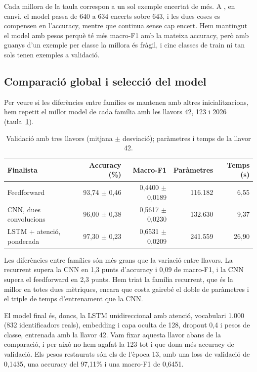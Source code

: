 \documentclass[11pt,a4paper]{article}
\newcommand{\intent}[1]{\texttt{\detokenize{#1}}}
\begin{document}
Cada millora de la taula correspon a un sol exemple encertat de més. A \intent{flight}, en canvi, el model passa de
640 a 634 encerts sobre 643, i les dues coses es compensen en l'accuracy, mentre que \intent{meal} continua sense
cap encert. Hem mantingut el model amb pesos perquè té més macro-F1 amb la mateixa accuracy, però amb guanys d'un
exemple per classe la millora és fràgil, i cinc classes de train ni tan sols tenen exemples a validació.

\subsection{Comparació global i selecció del model}
\label{sec:global}

Per veure si les diferències entre famílies es mantenen amb altres inicialitzacions, hem repetit el millor model
de cada família amb les llavors 42, 123 i 2026 (taula~\ref{tab:finalistes}).

\begin{table}[ht]
\centering\small
\caption{Validació amb tres llavors (mitjana $\pm$ desviació); paràmetres i temps de la llavor 42.}
\label{tab:finalistes}
\begin{tabular}{lrrrr}
\toprule
Finalista & Accuracy (\%) & Macro-F1 & Paràmetres & Temps (s)\\
\midrule
Feedforward & 93,74 $\pm$ 0,46 & 0,4400 $\pm$ 0,0189 & 116.182 & 6,55 \\
CNN, dues convolucions & 96,00 $\pm$ 0,38 & 0,5617 $\pm$ 0,0230 & 132.630 & 9,37 \\
LSTM + atenció, ponderada & 97,30 $\pm$ 0,23 & 0,6531 $\pm$ 0,0209 & 241.559 & 26,90 \\
\bottomrule
\end{tabular}
\end{table}

Les diferències entre famílies són més grans que la variació entre llavors. La recurrent supera la CNN en 1,3
punts d'accuracy i 0,09 de macro-F1, i la CNN supera el feedforward en 2,3 punts. Hem triat la família recurrent,
que és la millor en totes dues mètriques, encara que costa gairebé el doble de paràmetres i el triple de temps
d'entrenament que la CNN.

El model final és, doncs, la LSTM unidireccional amb atenció, vocabulari 1.000 (832 identificadors reals),
embedding i capa oculta de 128, dropout 0,4 i pesos de classe, entrenada amb la llavor 42. Vam fixar aquesta llavor
abans de la comparació, i per això no hem agafat la 123 tot i que dona més accuracy de validació. Els pesos
restaurats són els de l'època 13, amb una loss de validació de 0,1435, una accuracy del 97,11\% i una macro-F1 de
0,6451.
\end{document}
